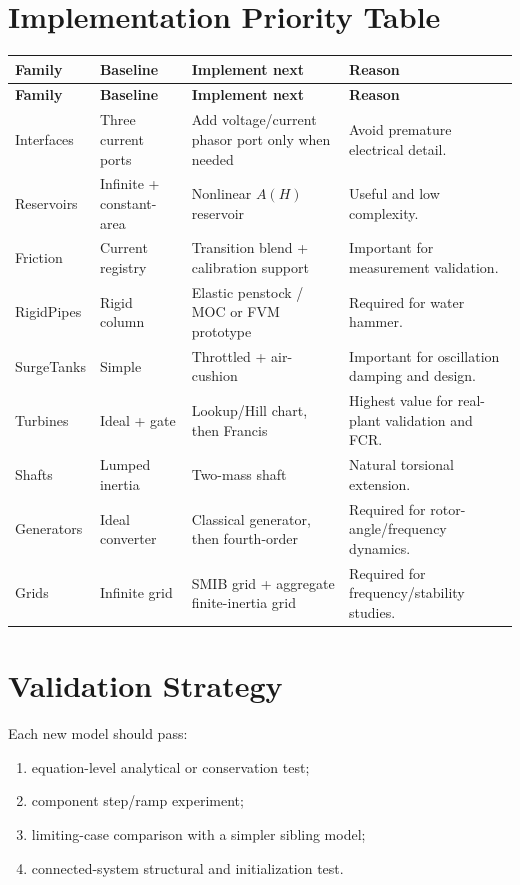 \documentclass[10pt,a4paper]{article}
\begin{document}
\section{Implementation Priority Table}
\small
\begin{longtable}{p{2.5cm}p{4.2cm}p{4.3cm}p{4.0cm}}
\toprule
\textbf{Family} & \textbf{Baseline} & \textbf{Implement next} & \textbf{Reason} \\
\midrule
\endfirsthead
\toprule
\textbf{Family} & \textbf{Baseline} & \textbf{Implement next} & \textbf{Reason} \\
\midrule
\endhead

Interfaces & Three current ports & Add voltage/current phasor port only when needed & Avoid premature electrical detail. \\
Reservoirs & Infinite + constant-area & Nonlinear $A(H)$ reservoir & Useful and low complexity. \\
Friction & Current registry & Transition blend + calibration support & Important for measurement validation. \\
RigidPipes & Rigid column & Elastic penstock / MOC or FVM prototype & Required for water hammer. \\
SurgeTanks & Simple & Throttled + air-cushion & Important for oscillation damping and design. \\
Turbines & Ideal + gate & Lookup/Hill chart, then Francis & Highest value for real-plant validation and FCR. \\
Shafts & Lumped inertia & Two-mass shaft & Natural torsional extension. \\
Generators & Ideal converter & Classical generator, then fourth-order & Required for rotor-angle/frequency dynamics. \\
Grids & Infinite grid & SMIB grid + aggregate finite-inertia grid & Required for frequency/stability studies. \\
\bottomrule
\end{longtable}
\normalsize

\section{Validation Strategy}
Each new model should pass:
\begin{enumerate}
\item equation-level analytical or conservation test;
\item component step/ramp experiment;
\item limiting-case comparison with a simpler sibling model;
\item connected-system structural and initialization test.
\end{enumerate}
\end{document}
